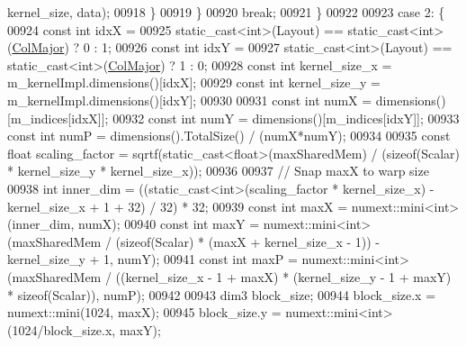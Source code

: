 \begin{DoxyCode}
      kernel\_size, data);
00918           \}
00919         \}
00920         \textcolor{keywordflow}{break};
00921       \}
00922 
00923       \textcolor{keywordflow}{case} 2: \{
00924         \textcolor{keyword}{const} \textcolor{keywordtype}{int} idxX =
00925             \textcolor{keyword}{static\_cast<}\textcolor{keywordtype}{int}\textcolor{keyword}{>}(Layout) == static\_cast<int>(\hyperlink{group__enums_ggaacded1a18ae58b0f554751f6cdf9eb13a0cbd4bdd0abcfc0224c5fcb5e4f6669a}{ColMajor}) ? 0 : 1;
00926         \textcolor{keyword}{const} \textcolor{keywordtype}{int} idxY =
00927             \textcolor{keyword}{static\_cast<}\textcolor{keywordtype}{int}\textcolor{keyword}{>}(Layout) == static\_cast<int>(\hyperlink{group__enums_ggaacded1a18ae58b0f554751f6cdf9eb13a0cbd4bdd0abcfc0224c5fcb5e4f6669a}{ColMajor}) ? 1 : 0;
00928         \textcolor{keyword}{const} \textcolor{keywordtype}{int} kernel\_size\_x = m\_kernelImpl.dimensions()[idxX];
00929         \textcolor{keyword}{const} \textcolor{keywordtype}{int} kernel\_size\_y = m\_kernelImpl.dimensions()[idxY];
00930 
00931         \textcolor{keyword}{const} \textcolor{keywordtype}{int} numX = dimensions()[m\_indices[idxX]];
00932         \textcolor{keyword}{const} \textcolor{keywordtype}{int} numY = dimensions()[m\_indices[idxY]];
00933         \textcolor{keyword}{const} \textcolor{keywordtype}{int} numP = dimensions().TotalSize() / (numX*numY);
00934 
00935         \textcolor{keyword}{const} \textcolor{keywordtype}{float} scaling\_factor = sqrtf(static\_cast<float>(maxSharedMem) / (\textcolor{keyword}{sizeof}(Scalar) * 
      kernel\_size\_y * kernel\_size\_x));
00936 
00937         \textcolor{comment}{// Snap maxX to warp size}
00938         \textcolor{keywordtype}{int} inner\_dim = ((\textcolor{keyword}{static\_cast<}\textcolor{keywordtype}{int}\textcolor{keyword}{>}(scaling\_factor * kernel\_size\_x) - kernel\_size\_x + 1 + 32) / 32) 
      * 32;
00939         \textcolor{keyword}{const} \textcolor{keywordtype}{int} maxX = numext::mini<int>(inner\_dim, numX);
00940         \textcolor{keyword}{const} \textcolor{keywordtype}{int} maxY = numext::mini<int>(maxSharedMem / (\textcolor{keyword}{sizeof}(Scalar) * (maxX + kernel\_size\_x - 1)) - 
      kernel\_size\_y + 1, numY);
00941         \textcolor{keyword}{const} \textcolor{keywordtype}{int} maxP = numext::mini<int>(maxSharedMem / ((kernel\_size\_x - 1 + maxX) * (kernel\_size\_y - 1 
      + maxY) * \textcolor{keyword}{sizeof}(Scalar)), numP);
00942 
00943         dim3 block\_size;
00944         block\_size.x = numext::mini(1024, maxX);
00945         block\_size.y = numext::mini<int>(1024/block\_size.x, maxY);

\end{DoxyCode}
